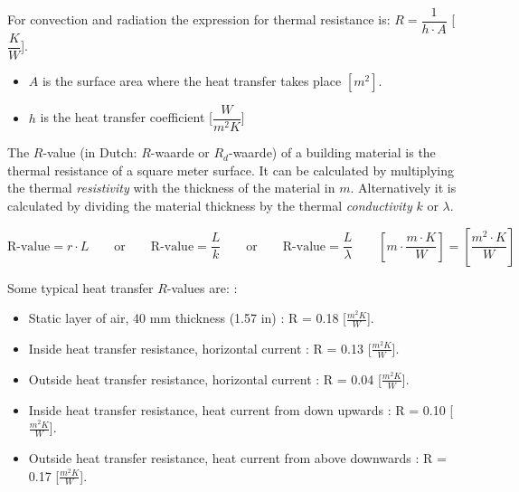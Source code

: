 For convection and radiation the expression for thermal resistance is: $R = \dfrac{1}{h \cdot A}$ [$\dfrac{K}{W}$].

\begin{itemize}
    \item $A$ is the surface area where the heat transfer takes place $[m^2]$.
    \item $h$ is the heat transfer coefficient  [$\dfrac{W}{m^2K}$]
\end{itemize}


The $R$-value (in Dutch: $R$-waarde or $R_d$-waarde) of a building material \cite{Rvalues_insulation} is the thermal resistance of a square meter surface.
It can be calculated by multiplying the thermal \emph{resistivity} with the thickness of the material in  $m$.
Alternatively it is calculated by dividing the material thickness by the thermal \emph{conductivity} $k$ or $\lambda$.

\begin{equation}
	\text{R-value} = r \cdot L  \qquad \text{or} \qquad  \text{R-value} = \frac{L}{k}  \qquad \text{or} \qquad  
	\text{R-value} = \frac{L}{\lambda}  \qquad \left[m \cdot \frac{m \cdot K}{W} \right] = \left[\frac{m^2 \cdot K}{W}\right] 
\end{equation}


Some typical heat transfer $R$-values are: \cite{OVERALL}: 

\begin{itemize}
	\item Static layer of air, 40 mm thickness (1.57 in)  : R = 0.18 [$\frac{m^2K}{W}$].
	\item Inside heat transfer resistance, horizontal current : R = 0.13 [$\frac{m^2K}{W}$]. 
	\item Outside heat transfer resistance, horizontal current : R = 0.04 [$\frac{m^2K}{W}$].
	\item Inside heat transfer resistance, heat current from down upwards : R = 0.10 [$\frac{m^2K}{W}$].
	\item Outside heat transfer resistance, heat current from above downwards : R = 0.17 [$\frac{m^2K}{W}$].
\end{itemize}


